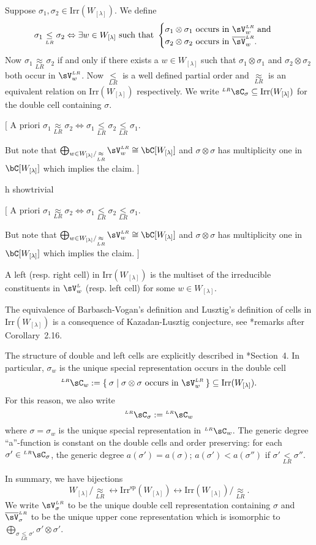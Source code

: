 \documentclass[12pt,a4paper]{amsart}
\newcommand{\trivial}[2][]{\if\relax\detokenize{#1}\relax
  {%
      \color{orange} \vspace{0em} $[$  #2 $]$
      \color{black}
  }
  \else
\ifx#1h
\ifcsname showtrivial\endcsname
{%
    \color{orange} \vspace{0em}  $[$ #2 $]$
    \color{black}
}
\fi
\else {\red Wrong argument!} \fi
\fi
}
\numberwithin{equation}{section}
\theoremstyle{remark}
\def\Irr{\mathrm{Irr}}
\def\Irrsp{\mathrm{Irr}^{\text{sp}}}
\def\Wlam{W_{[\lambda]}}
\def\LRC{{}^{\scriptscriptstyle LR}\sC}
\def\bVLR{{\overline{\sV}}^{\scriptscriptstyle LR}}
\def\VL{{\sV}^{\scriptscriptstyle L}}
\def\VLR{{\sV}^{\scriptscriptstyle LR}}
\def\lneqLR{\mathrel{\mathop{<}\limits_{\scriptscriptstyle LR}}}
\def\leqLR{\mathrel{\mathop{\leq}\limits_{\scriptscriptstyle LR}}}
\def\approxLR{\mathrel{\mathop{\approx}\limits_{\scriptscriptstyle LR}}}
\begin{document}
Suppose $\sigma_{1}, \sigma_{2}\in \Irr(W_{[\lambda]})$. We define
\[
  \sigma_{1}\leqLR \sigma_{2} \Leftrightarrow \exists w\in W_{[\lambda]} \text{
    such that }
  \begin{cases}
    \sigma_{1} \otimes \sigma_{1} \text{ occurs in } \VLR_{w}
    \text{ and } \\
    \sigma_{2} \otimes \sigma_{2} \text{ occurs in } \bVLR_{w}.
  \end{cases}
\]
Now $\sigma_{1}\approxLR \sigma_{2}$ if and only if there exists a
$w\in W_{[\lambda]}$ such that $\sigma_{1} \otimes \sigma_{1}$ and
$\sigma_{2} \otimes \sigma_{2}$ both occur in $\VLR_{w}$. Now $\leqLR$ is a well
defined partial order and $\approxLR$ is an equivalent relation on
$\Irr(W_{[\lambda]})$ respectively. We write
$\LRC_{\sigma}\subseteq \Irr(\Wlam)$ for the double cell containing $\sigma$.
\trivial[]{ A priori
  $\sigma_{1}\approxLR \sigma_{2}\Leftrightarrow \sigma_{1}\leqLR \sigma_{2}\leqLR \sigma_{1}$.

  But note that $\bigoplus_{w\in \Wlam/\approxLR} \VLR_{w} \cong \bC[\Wlam]$ and
  $\sigma\otimes \sigma$ has multiplicity one in $\bC[\Wlam]$ which implies the
  claim. }

A left (resp. right cell) in $\Irr(\Wlam)$ is the multiset of the irreducible
constituents in $\VL_{w}$ (resp. left cell) for some $w\in \Wlam$.

The equivalence of Barbasch-Vogan's definition and Lusztig's definition of cells
in $\Irr(\Wlam)$ is a consequence of Kazadan-Lusztig conjecture, see
\cite{BV2}*{remarks after Corollary~2.16}.

The structure of double and left cells are explicitly described in
\cite{Lu}*{Section~4}. In particular, $\sigma_{w}$ is the unique special
representation occurs in the double cell
\[
  \LRC_{w}:= \Set{\sigma| \sigma\otimes \sigma \text{ occurs in
    } \VLR_{w}} \subseteq \Irr(\Wlam).
\]
For this reason, we also write
\[
  \LRC_{\sigma}:=\LRC_{w}
\]
where $\sigma=\sigma_{w}$ is the unique special representation in $\LRC_{w}$.
The generic degree ``a''-function is constant on the double cells and order
preserving: for each $\sigma'\in \LRC_{\sigma}$, the generic degree
$a(\sigma')=a(\sigma)$; $a(\sigma')<a(\sigma'')$ if $\sigma'\lneqLR \sigma''$.

In summary, we have bijections
\[
  \Wlam/\approxLR \longleftrightarrow\Irrsp(\Wlam)\longleftrightarrow \Irr(\Wlam)/\approxLR.
\]
We write $\VLR_{\sigma}$ to be the unique double cell representation containing
$\sigma$ and $\bVLR_{\sigma}$ to be the unique upper cone representation which
is isomorphic to $\bigoplus_{\sigma\leqLR \sigma'}\sigma'\otimes \sigma'$.
\end{document}
